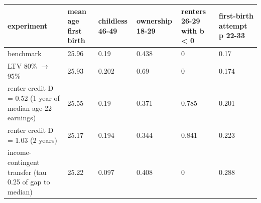 \begingroup\small
\setlength{\tabcolsep}{3pt}
\renewcommand{\arraystretch}{1.04}
\begin{tabularx}{\linewidth}{XXXXXX}
\toprule
experiment & mean age first birth & childless 46-49 & ownership 18-29 & renters 26-29 with b \textless{} 0 & first-birth attempt p 22-33 \\
\midrule
benchmark & 25.96 & 0.19 & 0.438 & 0 & 0.17 \\
LTV 80\% $\to$ 95\% & 25.93 & 0.202 & 0.69 & 0 & 0.174 \\
renter credit D = 0.52 (1 year of median age-22 earnings) & 25.55 & 0.19 & 0.371 & 0.785 & 0.201 \\
renter credit D = 1.03 (2 years) & 25.17 & 0.194 & 0.344 & 0.841 & 0.223 \\
income-contingent transfer (tau 0.25 of gap to median) & 25.22 & 0.097 & 0.408 & 0 & 0.288 \\
\bottomrule
\end{tabularx}
\endgroup
